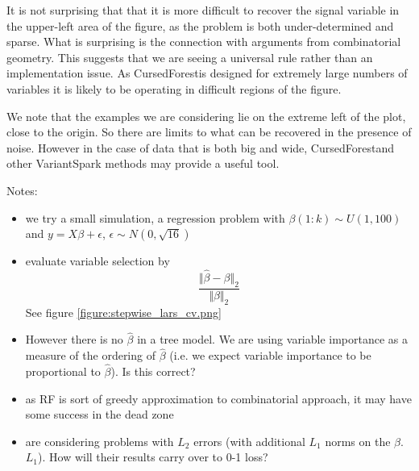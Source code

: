 \documentclass[10pt,letterpaper]{article}
\newcommand{\cursedforest}{{\sc CursedForest}}
\begin{document}
It is not surprising that that it is more difficult to recover the signal variable in the upper-left area of the figure,
as the problem is both under-determined and sparse. What is surprising is the connection with arguments from
combinatorial geometry. This suggests that we are seeing a universal rule rather than an implementation issue. As
\cursedforest is designed for extremely large numbers of variables it is likely to be operating in difficult regions of
the figure. 

We note that the examples we are considering lie on the extreme left of the plot, close to the origin. So there are
limits to what can be recovered in the presence of noise. However in the case of data that is both big and wide,
\cursedforest and other VariantSpark methods may provide a useful tool.

Notes:
\begin{itemize}
\item we try a small simulation, a regression problem with $\beta(1:k) \sim U(1,100)$ and $y= X\beta + \epsilon$, $\epsilon \sim  N(0,\sqrt{16})$
\item \cite{Donoho.and.Stodden.2006} evaluate variable selection by 
$$\frac{\Vert\hat{\beta}-\beta\Vert_2}{\Vert\beta\Vert_2}$$
See figure \ref{figure:stepwise_lars_cv.png} 
\item 
However there is no $\hat{\beta}$ in a tree model. We are using variable importance as
a measure of the ordering of $\hat{\beta}$ (i.e. we expect variable importance to be proportional to $\hat{\beta}$). Is this correct?
\item as RF is sort of greedy approximation to combinatorial approach, it may have some success in the dead zone
\item  \cite{Donoho.and.Stodden.2006} are considering problems with $L_2$ errors (with additional  $L_1$ norms on the
  $\beta$. $L_1$).
How will their results carry over to 0-1 loss?
\end{itemize}
\end{document}
